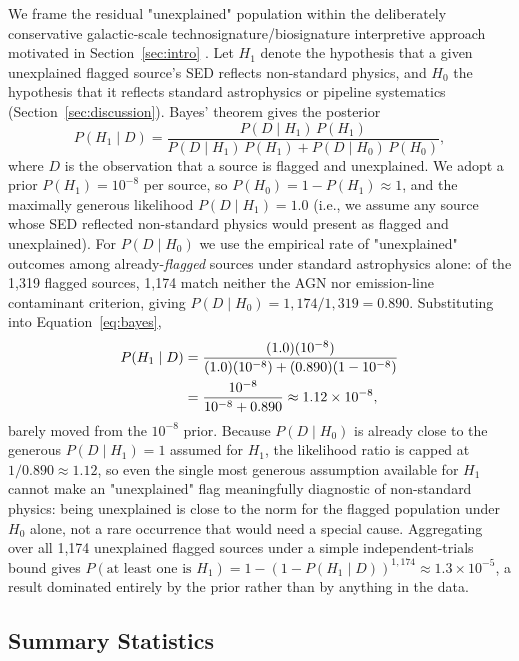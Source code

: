 \documentclass[twocolumn]{aastex631}
\begin{document}
We frame the residual "unexplained" population within the deliberately
conservative galactic-scale technosignature/biosignature interpretive
approach motivated in Section~\ref{sec:intro}
\citep{Wright2014, LingamLoeb2019, Lacki2016}. Let $H_1$ denote the
hypothesis that a given unexplained flagged source's SED reflects
non-standard physics, and $H_0$ the hypothesis that it reflects standard
astrophysics or pipeline systematics (Section~\ref{sec:discussion}). Bayes'
theorem gives the posterior
\begin{equation}
P(H_1\mid D) = \frac{P(D\mid H_1)\,P(H_1)}{P(D\mid H_1)\,P(H_1) +
P(D\mid H_0)\,P(H_0)},
\label{eq:bayes}
\end{equation}
where $D$ is the observation that a source is flagged and unexplained. We
adopt a prior $P(H_1) = 10^{-8}$ per source, so $P(H_0) = 1-P(H_1)
\approx 1$, and the maximally generous likelihood $P(D\mid H_1) = 1.0$
(i.e., we assume any source whose SED reflected non-standard
physics would present as flagged and unexplained). For
$P(D\mid H_0)$ we use the empirical rate of "unexplained" outcomes among
already-\emph{flagged} sources under standard astrophysics alone: of the
1,319 flagged sources, 1,174 match neither the AGN nor emission-line
contaminant criterion, giving $P(D\mid H_0) = 1{,}174/1{,}319 = 0.890$.
Substituting into Equation~\ref{eq:bayes},
\begin{align}
P(H_1\mid D) &= \frac{(1.0)(10^{-8})}{(1.0)(10^{-8}) +
(0.890)(1-10^{-8})} \notag\\
&= \frac{10^{-8}}{10^{-8} + 0.890} \approx 1.12\times10^{-8},
\label{eq:bayes-result}
\end{align}
barely moved from the $10^{-8}$ prior. Because $P(D\mid H_0)$ is already
close to the generous $P(D\mid H_1)=1$ assumed for $H_1$, the likelihood
ratio is capped at $1/0.890\approx1.12$, so even the single most generous
assumption available for $H_1$ cannot make an "unexplained" flag
meaningfully diagnostic of non-standard physics: being unexplained is
close to the norm for the flagged population under $H_0$ alone, not a rare
occurrence that would need a special cause. Aggregating over all 1,174
unexplained flagged sources under a simple independent-trials bound gives
$P(\text{at least one is } H_1) = 1-(1-P(H_1\mid D))^{1{,}174}
\approx 1.3\times10^{-5}$, a result dominated entirely by the prior rather
than by anything in the data.

\subsection{Summary Statistics}
\label{sec:results-summary}
\end{document}
